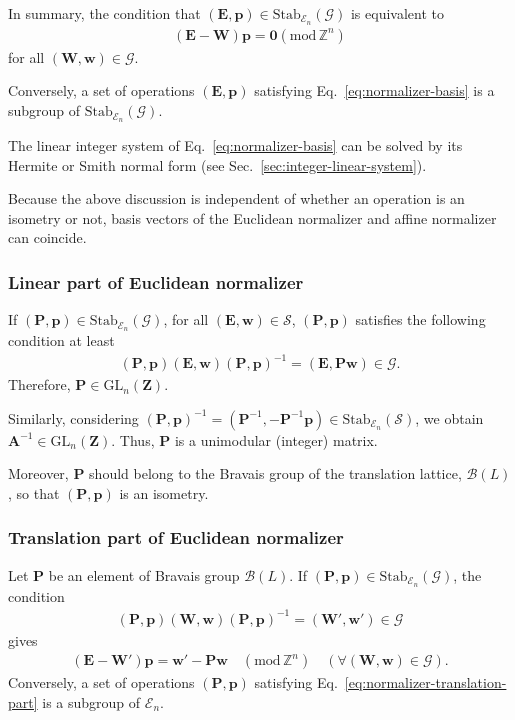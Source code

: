In summary, the condition that $(\bm{E}, \bm{p} ) \in \mathrm{Stab}_{\mathcal{E}_{n}}(\mathcal{G})$ is equivalent to
\begin{align}
  \label{eq:normalizer-basis}
  (\bm{E} - \bm{W} ) \bm{p} = \bm{0} ( \mathrm{mod} \, \mathbb{Z}^{n} )
\end{align}
for all $(\bm{W}, \bm{w}) \in \mathcal{G}$.

Conversely, a set of operations $(\bm{E}, \bm{p})$ satisfying Eq.~\eqref{eq:normalizer-basis} is a subgroup of $\mathrm{Stab}_{\mathcal{E}_{n}}(\mathcal{G})$.

The linear integer system of Eq.~\eqref{eq:normalizer-basis} can be solved by its Hermite or Smith normal form (see Sec.~\ref{sec:integer-linear-system}).

Because the above discussion is independent of whether an operation is an isometry or not, basis vectors of the Euclidean normalizer and affine normalizer can coincide.

\subsubsection{Linear part of Euclidean normalizer}
If $(\bm{P}, \bm{p} ) \in \mathrm{Stab}_{\mathcal{E}_{n}}(\mathcal{G})$, for all $(\bm{E}, \bm{w}) \in \mathcal{S}$, $(\bm{P}, \bm{p})$ satisfies the following condition at least
\begin{align}
  (\bm{P}, \bm{p}) (\bm{E}, \bm{w}) (\bm{P}, \bm{p})^{-1} = (\bm{E}, \bm{Pw}) \in \mathcal{G}.
\end{align}
Therefore, $\bm{P} \in \mathrm{GL}_{n}(\mathbf{Z})$.

Similarly, considering $(\bm{P}, \bm{p} )^{-1} = (\bm{P}^{-1}, -\bm{P}^{-1}\bm{p} ) \in \mathrm{Stab}_{\mathcal{E}_{n}}(\mathcal{S})$, we obtain $\bm{A}^{-1} \in \mathrm{GL}_{n}(\mathbf{Z})$.
Thus, $\bm{P}$ is a unimodular (integer) matrix.

Moreover, $\bm{P}$ should belong to the Bravais group of the translation lattice, $\mathcal{B}(L)$, so that $(\bm{P}, \bm{p} )$ is an isometry.

\subsubsection{Translation part of Euclidean normalizer}
Let $\bm{P}$ be an element of Bravais group $\mathcal{B}(L)$.
If $(\bm{P}, \bm{p} ) \in \mathrm{Stab}_{\mathcal{E}_{n}}(\mathcal{G})$, the condition
\begin{align}
  (\bm{P}, \bm{p}) (\bm{W}, \bm{w}) (\bm{P}, \bm{p})^{-1} = (\bm{W}', \bm{w}') \in \mathcal{G}
\end{align}
gives
\begin{align}
    \label{eq:normalizer-translation-part}
    (\bm{E} - \bm{W}' ) \bm{p} = \bm{w}' - \bm{Pw} \quad (\mathrm{mod}\, \mathbb{Z}^{n})
    \quad (\forall ( \bm{W}, \bm{w} ) \in \mathcal{G} ).
\end{align}
Conversely, a set of operations $(\bm{P}, \bm{p})$ satisfying Eq.~\eqref{eq:normalizer-translation-part} is a subgroup of $\mathcal{E}_{n}$.
